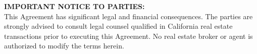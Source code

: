 \vspace{15pt}
\noindent
\textbf{IMPORTANT NOTICE TO PARTIES:} \\
This Agreement has significant legal and financial consequences. The parties are strongly advised to consult legal counsel qualified in California real estate transactions prior to executing this Agreement. No real estate broker or agent is authorized to modify the terms herein.

